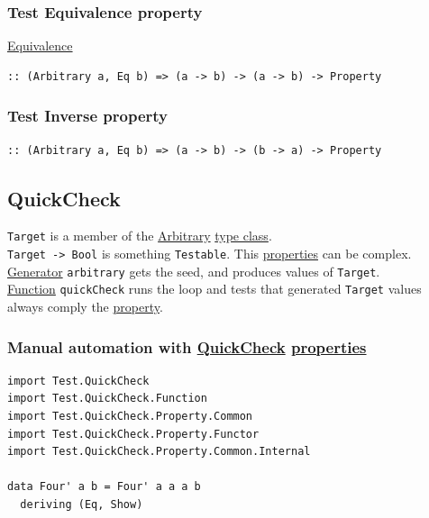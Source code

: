 \documentclass[a4paper,14pt,oneside]{book}
\begin{document}
{\subsubsection{\label{org6696cdc}Test Equivalence property}
\label{sec:orga0c29cb}
\hyperref[orgea1116b]{Equivalence}\\
\begin{verbatim}
:: (Arbitrary a, Eq b) => (a -> b) -> (a -> b) -> Property
\end{verbatim}

\subsubsection{\label{org8ecd600}Test Inverse property}
\label{sec:orgcc14f70}
\begin{verbatim}
:: (Arbitrary a, Eq b) => (a -> b) -> (b -> a) -> Property
\end{verbatim}

\subsection{\label{org70b9ba4}QuickCheck}
\label{sec:org5eecde9}
\texttt{Target} is a member of the \hyperref[org4a2927f]{Arbitrary} \hyperref[org6c8048d]{type class}.\\
\texttt{Target -> Bool} is something \texttt{Testable}. This \hyperref[org5fc06ca]{properties} can be complex.\\
\hyperref[orgaa4e85e]{Generator} \texttt{arbitrary} gets the seed, and produces values of \texttt{Target}.\\
\hyperref[org6a60524]{Function} \texttt{quickCheck} runs the loop and tests that generated \texttt{Target} values always comply the \hyperref[org2731790]{property}.\\

\subsubsection{Manual automation with \hyperref[org70b9ba4]{QuickCheck} \hyperref[org5fc06ca]{properties}}
\label{sec:orgdf46c8a}

\begin{verbatim}
import Test.QuickCheck
import Test.QuickCheck.Function
import Test.QuickCheck.Property.Common
import Test.QuickCheck.Property.Functor
import Test.QuickCheck.Property.Common.Internal

data Four' a b = Four' a a a b
  deriving (Eq, Show)


\end{verbatim}}
\end{document}
